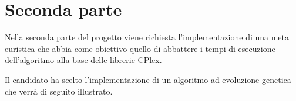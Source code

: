 %
%
\chapter{Seconda parte}
\label{pt2}
Nella seconda parte del progetto viene richiesta l'implementazione di una meta euristica che abbia come obiettivo quello di abbattere i tempi di esecuzione dell'algoritmo alla base delle librerie CPlex.

Il candidato ha scelto l'implementazione di un algoritmo ad evoluzione genetica che verrà di seguito illustrato.

